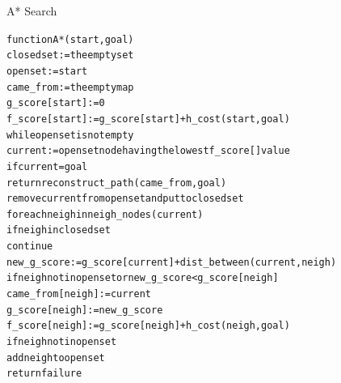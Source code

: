 \documentclass{beamer}
\begin{document}
\begin{frame}{A* Search}
\begin{alltt}
\fontsize{8pt}{10pt}\selectfont
function A*(start,goal) \\
\hspace*{0.5cm}    closedset := the empty set \\
\hspace*{0.5cm}    openset := {start} \\
\hspace*{0.5cm}    came\_from := the empty map \\
\hspace*{0.5cm}    g\_score[start] := 0 \\
\hspace*{0.5cm}    f\_score[start] := g\_score[start] + h\_cost(start, goal) \\
\hspace*{0.5cm}    while openset is not empty \\
\hspace*{1cm}        current := openset node having the lowest f\_score[] value \\
\hspace*{1cm}        if current = goal \\
\hspace*{1.5cm}            return reconstruct\_path(came\_from, goal) \\
\hspace*{1cm}        remove current from openset and put to closedset \\
\hspace*{1cm}        for each neigh in neigh\_nodes(current) \\
\hspace*{1.5cm}            if neigh in closedset \\
\hspace*{2cm}                continue \\
\hspace*{1.5cm}            new\_g\_score := g\_score[current] + dist\_between(current,neigh) \\
\hspace*{1.5cm}            if neigh not in openset or new\_g\_score < g\_score[neigh] \\
\hspace*{2cm}                came\_from[neigh] := current \\
\hspace*{2cm}                g\_score[neigh] := new\_g\_score \\
\hspace*{2cm}                f\_score[neigh] := g\_score[neigh] + h\_cost(neigh, goal) \\
\hspace*{2cm}                if neigh not in openset \\
\hspace*{2.5cm}                    add neigh to openset \\
\hspace*{0.5cm}    return failure
\end{alltt}
\end{frame}
\end{document}
